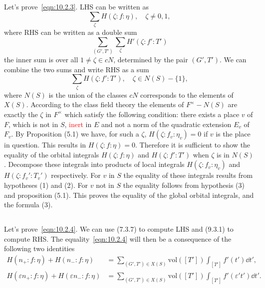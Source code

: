 \subsection{}
Let's prove~\eqref{eqn:10.2.3}.
LHS can be written as
\begin{equation*}
    \sum_{\zeta} H(\zeta:f:\eta), \quad \zeta \neq 0, 1,
\end{equation*}
where RHS can be written as a double sum
\begin{equation*}
    \sum_{(G', T')}\sum_{\zeta}H'(\zeta:f':T')
\end{equation*}
the inner sum is over all $1 \neq \zeta \in cN$, determined by the pair $(G', T')$.
We can combine the two sums and write RHS as a sum
\begin{equation*}
    \sum_{\zeta} H(\zeta:f':T'), \quad \zeta \in N(S) - \{1\},
\end{equation*}
where $N(S)$ is the union of the classes $cN$ corresponds to  the elements of $X(S)$.
According to the class field theory the elements of $F^\times - N(S)$ are exactly the $\zeta$ in $F^\times$ which satisfy the following condition: there exists a place $v$ of $F$, which is not in $S$, \textcolor{red}{inert} in $E$ and not a norm of the quadratic extension $E_v$ of $F_v$.
By Proposition (5.1) we have, for such a $\zeta$, $H(\zeta:f_v:\eta_v)=0$ if $v$ is the place in question.
This results in $H(\zeta:f:\eta)=0$.
Therefore it is sufficient to show the equality of the orbital integrals $H(\zeta:f:\eta)$ and $H(\zeta:f':T')$ when $\zeta$ is in $N(S)$.
Decompose these integrals into products of local integrals $H(\zeta:f_v:\eta_v)$ and $H(\zeta:f_v':T_v')$ respectively.
For $v$ in $S$ the equality of these integrals results from hypotheses (1) and (2).
For $v$ not in $S$ the equality follows from hypothesis (3) and proposition (5.1).
This proves the equality of the global orbital integrals, and the formula (3).


\subsection{}
Let's prove~\eqref{eqn:10.2.4}.
We can use (7.3.7) to compute LHS and (9.3.1) to compute RHS.
The equality~\eqref{eqn:10.2.4} will then be a consequence of the following two identities
\begin{align}
    H(n_+: f: \eta) + H(n_-:f:\eta) &= \sum_{(G',T') \in X(S)} \mathrm{vol}([T']) \int_{[T']} f'(t')\dd t', \label{eqn:10.4.1}\\
    H(\varepsilon n_+: f:\eta) + H(\varepsilon n_-:f:\eta) &= \sum_{(G',T')\in X(S)} \mathrm{vol}([T']) \int_{[T']} f'(\varepsilon't')\dd t'.
\end{align}

